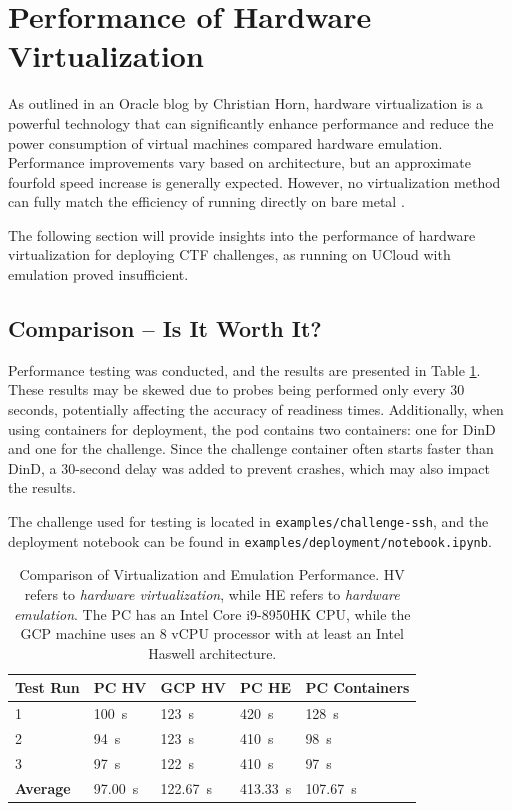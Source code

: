 \section{Performance of Hardware Virtualization}
As outlined in an Oracle blog by Christian Horn, hardware virtualization is a powerful technology that can significantly enhance performance and reduce the power consumption of virtual machines compared  hardware emulation. Performance improvements vary based on architecture, but an approximate fourfold speed increase is generally expected. However, no virtualization method can fully match the efficiency of running directly on bare metal \parencite{horn2025virtualization}.

The following section will provide insights into the performance of hardware virtualization for deploying CTF challenges, as running on UCloud with emulation proved insufficient.

\subsection{Comparison -- Is It Worth It?}
Performance testing was conducted, and the results are presented in Table \ref{table:performance}. These results may be skewed due to probes being performed only every 30 seconds, potentially affecting the accuracy of readiness times. Additionally, when using containers for deployment, the pod contains two containers: one for DinD and one for the challenge. Since the challenge container often starts faster than DinD, a 30-second delay was added to prevent crashes, which may also impact the results.

The challenge used for testing is located in \texttt{examples/challenge-ssh}, and the deployment notebook can be found in \texttt{examples/deployment/notebook.ipynb}.

\begin{table}[h]
\centering
\begin{tabular}{|l|l|l|l|l|}
\hline
\textbf{Test Run} & \textbf{PC HV} & \textbf{GCP HV} & \textbf{PC HE} & \textbf{PC Containers} \\ \hline
1 & \SI{100}{\second} & \SI{123}{\second} & \SI{420}{\second} & \SI{128}{\second} \\ \hline
2 & \SI{94}{\second}  & \SI{123}{\second} & \SI{410}{\second} & \SI{98}{\second}  \\ \hline
3 & \SI{97}{\second}  & \SI{122}{\second} & \SI{410}{\second} & \SI{97}{\second}  \\ \hline \hline
\textbf{Average} & \SI{97.00}{\second} & \SI{122.67}{\second} & \SI{413.33}{\second} & \SI{107.67}{\second} \\ \hline
\end{tabular}
\caption{Comparison of Virtualization and Emulation Performance. HV refers to \textit{hardware virtualization}, while HE refers to \textit{hardware emulation}. The PC has an Intel Core i9-8950HK CPU, while the GCP machine uses an 8 vCPU processor with at least an Intel Haswell architecture.}
\label{table:performance}
\end{table}

